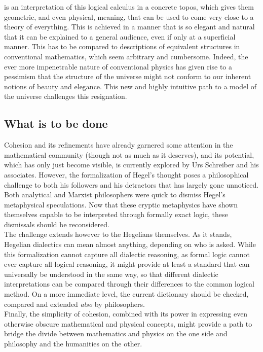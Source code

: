 \documentclass{article}
\begin{document}
is an interpretation of this logical calculus in a concrete topos, which gives them geometric, and even
physical, meaning, that can be used to come very close to a theory of everything. This is achieved in
a manner that is so elegant and natural that it can be explained to a general audience, even if only at
a superficial manner. This has to be compared to descriptions of equivalent structures in conventional
mathematics, which seem arbitrary and cumbersome. Indeed, the ever more impenetrable nature of conventional
physics has given rise to a pessimism that the structure of the universe might not conform to our inherent
notions of beauty and elegance. This new and highly intuitive path to a model of the universe challenges
this resignation. \\


\subsection{What is to be done}
Cohesion and its refinements have already garnered some attention in the mathematical community (though
not as much as it deserves), and its potential, which has only just become visible, is currently explored
by Urs Schreiber and his associates. However, the formalization of Hegel's thought poses a philosophical
challenge to both his followers and his detractors that has largely gone unnoticed. Both analytical and
Marxist philosophers were quick to dismiss Hegel's metaphysical speculations. Now that these cryptic metaphysics
have shown themselves capable to be interpreted through formally exact logic, these dismissals should
be reconsidered. \\

The challenge extends however to the Hegelians themselves. As it stands, Hegelian dialectics can mean
almost anything, depending on who is asked. While this formalization cannot capture all dialectic reasoning,
as formal logic cannot ever capture all logical reasoning, it might provide at least a standard that can
universally be understood in the same way, so that different dialectic interpretations can be compared
through their differences to the common logical method. On a more immediate level, the current dictionary
should be checked, compared and extended \emph{also} by philosophers. \\

Finally, the simplicity of cohesion, combined with its power in expressing even otherwise obscure mathematical
and physical concepts, might provide a path to bridge the divide between mathematics and physics on the
one side and philosophy and the humanities on the other.















\printbibliography[
heading=bibintoc,
title={References}
]
\end{document}
